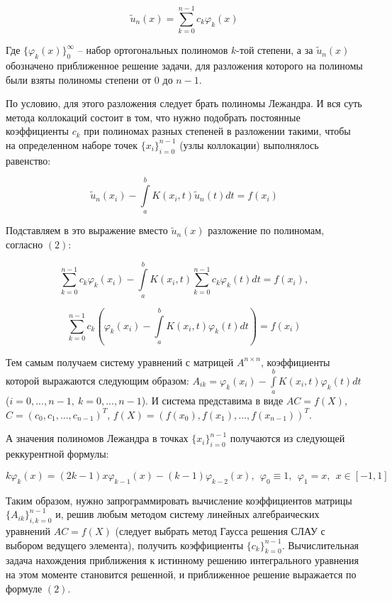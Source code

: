 \documentclass[12pt,a4paper]{article}
\begin{document}
\begin{equation}
 \tilde u_n(x) = \sum \limits_{k=0}^{n-1} c_k \varphi_k(x)
\end{equation}

Где $\{ \varphi_k(x) \}_0^{\infty}$ -- набор ортогональных полиномов $k$-той степени, а за $\tilde u_n(x) $ обозначено приближенное решение задачи, для разложения которого на полиномы были взяты полиномы степени от 0 до $n-1$.

По условию, для этого разложения следует брать полиномы Лежандра. И вся суть метода коллокаций состоит в том, что нужно подобрать постоянные коэффициенты $c_k$ при полиномах разных степеней в разложении такими, чтобы на определенном наборе точек $\{ x_i \}_{i=0}^{n-1}$ (узлы коллокации) выполнялось равенство:

\begin{equation}
 \tilde u_n(x_i) - \int\limits_a^b K(x_i,t) \tilde u_n(t) dt = f(x_i)
\end{equation}
 

Подставляем в это выражение вместо $\tilde u_n(x)$ разложение по полиномам, согласно $(2)$:

$$
 \sum \limits_{k=0}^{n-1} c_k \varphi_k(x_i) - 
 \int\limits_a^b K(x_i,t) \sum \limits_{k=0}^{n-1} c_k \varphi_k(t) dt
 = f(x_i),
$$

$$
 \sum \limits_{k=0}^{n-1} c_k  
 \left (
  \varphi_k(x_i) - \int\limits_a^b K(x_i,t) \varphi_k(t) dt
 \right )
 = f(x_i)
$$

Тем самым получаем систему уравнений с матрицей $A^{n \times n}$, коэффициенты которой выражаются следующим образом: $A_{ik} = \varphi_k(x_i) - \int\limits_a^b K(x_i,t) \varphi_k(t) dt$ \\ ($i=0,...,n-1, \ k=0,...,n-1$). И система представима в виде $ AC = f(X) $, 
$ C = \left ( c_0, c_1, ..., c_{n-1} \right )^T$, 
$ f(X) = \left ( f(x_0), f(x_1), ..., f(x_{n-1}) \right )^T $.

А значения полиномов Лежандра в точках $\{ x_i \}_{i=0}^{n-1}$ получаются из следующей реккурентной формулы:

\begin{equation}
 k\varphi_k(x) = (2k-1)x \varphi_{k-1}(x) - (k-1) \varphi_{k-2}(x), \ \ 
 \varphi_0 \equiv 1, \ \ \varphi_1 = x, \ \ x \in [-1,1]
\end{equation}

Таким образом, нужно запрограммировать вычисление коэффициентов матрицы $\{ A_{ik} \}_{i,k=0}^{n-1}$ и, решив любым методом систему линейных алгебраических уравнений $ AC = f(X) $ (следует выбрать метод Гаусса решения СЛАУ с выбором ведущего элемента), получить коэффициенты $\{ c_k \}_{k=0}^{n-1}$. Вычислительная задача нахождения приближения к истинному решению интегрального уравнения на этом моменте становится решенной, и приближенное решение выражается по формуле $(2)$.
\end{document}

